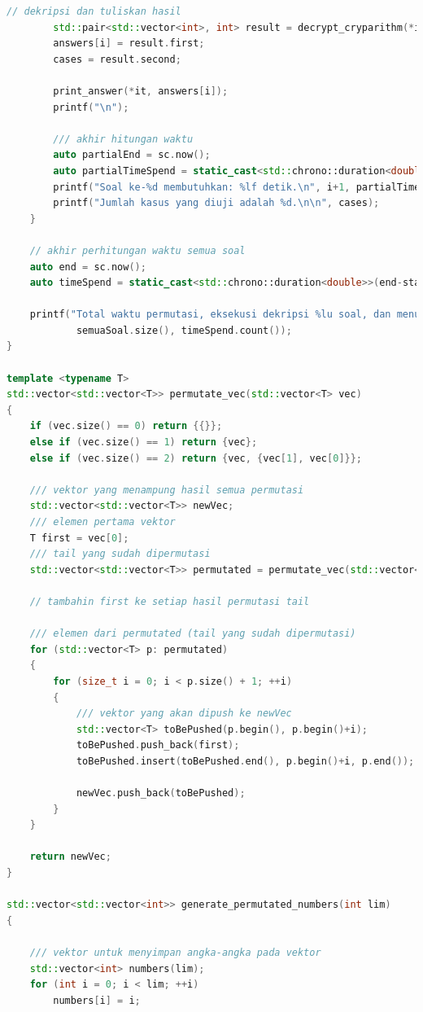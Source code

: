 \documentclass{article}
\begin{document}
\begin{lstlisting}[caption = main.cpp, language = c++]
        // dekripsi dan tuliskan hasil
        std::pair<std::vector<int>, int> result = decrypt_cryparithm(*it, permutatedNumbers);
        answers[i] = result.first;
        cases = result.second;

        print_answer(*it, answers[i]);
        printf("\n");

        /// akhir hitungan waktu
        auto partialEnd = sc.now();
        auto partialTimeSpend = static_cast<std::chrono::duration<double>>(partialEnd-partialStart);
        printf("Soal ke-%d membutuhkan: %lf detik.\n", i+1, partialTimeSpend.count());
        printf("Jumlah kasus yang diuji adalah %d.\n\n", cases);
    }

    // akhir perhitungan waktu semua soal
    auto end = sc.now();
    auto timeSpend = static_cast<std::chrono::duration<double>>(end-start);

    printf("Total waktu permutasi, eksekusi dekripsi %lu soal, dan menuliskan output adalah %lf detik.\n",
            semuaSoal.size(), timeSpend.count());
}

template <typename T>
std::vector<std::vector<T>> permutate_vec(std::vector<T> vec)
{
    if (vec.size() == 0) return {{}};
    else if (vec.size() == 1) return {vec};
    else if (vec.size() == 2) return {vec, {vec[1], vec[0]}};

    /// vektor yang menampung hasil semua permutasi
    std::vector<std::vector<T>> newVec;
    /// elemen pertama vektor
    T first = vec[0];
    /// tail yang sudah dipermutasi
    std::vector<std::vector<T>> permutated = permutate_vec(std::vector<T>(vec.begin()+1, vec.end()));

    // tambahin first ke setiap hasil permutasi tail

    /// elemen dari permutated (tail yang sudah dipermutasi)
    for (std::vector<T> p: permutated)
    {
        for (size_t i = 0; i < p.size() + 1; ++i)
        {
            /// vektor yang akan dipush ke newVec
            std::vector<T> toBePushed(p.begin(), p.begin()+i);
            toBePushed.push_back(first);
            toBePushed.insert(toBePushed.end(), p.begin()+i, p.end());

            newVec.push_back(toBePushed);
        }
    }

    return newVec;
}

std::vector<std::vector<int>> generate_permutated_numbers(int lim)
{

    /// vektor untuk menyimpan angka-angka pada vektor
    std::vector<int> numbers(lim);
    for (int i = 0; i < lim; ++i)
        numbers[i] = i;


\end{lstlisting}
\end{document}
